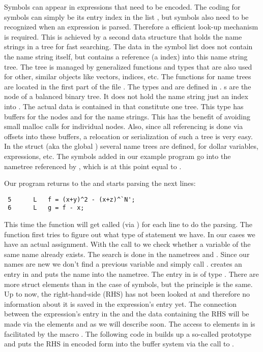 Symbols can appear in expressions that need to be encoded. The coding for
symbols can simply be its entry index in the list , but symbols
also need to be recognized when an expression is parsed. Therefore a efficient
look-up mechanism is required. This is achieved by a second data structure that
holds the name strings in a tree for fast searching. The data in the symbol list
does not contain the name string itself, but contains a reference (a index) into
this name string tree. The tree is managed by generalized functions and types
that are also used for other, similar objects like vectors, indices, etc. The
functions for name trees are located in the first part of the file .
The types  and  are defined in .
s are the node of a balanced binary tree. It does not hold the
name string just an index into . The actual data is contained in 
 that constitute one tree. This type has buffers for the nodes and
for the name strings. This has the benefit of avoiding small malloc calls for
individual nodes. Also, since all referencing is done via offsets into these
buffers, a relocation or serialization of such a tree is very easy. In the
struct  (aka the global ) several name trees are defined, for
dollar variables, expressions, etc. The symbols added in our example program go
into the nametree referenced by , which is at this point equal
to .

Our program returns to the  and starts parsing the next lines:

\begin{verbatim}
 5      L	f = (x+y)^2 - (x+z)^`N';
 6      L	g = f - x;
\end{verbatim}

This time the function  will get called (via ) for each
line to do the parsing.  The function  first tries to figure out
what type of  statement we have. In our cases we have an actual
assignment. With the call to  we check whether a variable of the same
name already exists. The search is done in the nametrees  and
. Since our names are new we don't find a previous variable and
simply call .  creates an entry in 
and puts the name into the  nametree. The entry in
 is of type . There are more struct
elements than in the case of symbols, but the principle is the same. Up to now,
the right-hand-side (RHS) has not been looked at and therefore no information
about it is saved in the expression's entry yet. The connection between the
expression's entry in the  and the data containing the RHS
will be made via the elements  and  as we will describe
soon.  The access to elements in  is facilitated by the
macro . The following code in  builds up a so-called
prototype and puts the RHS in encoded form into the buffer system via the call
to .

